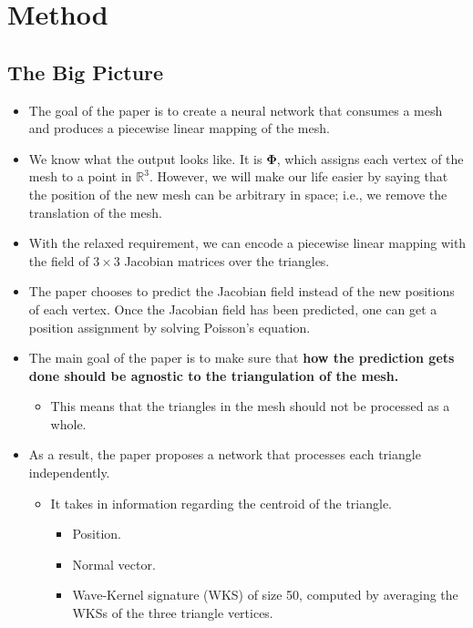 \documentclass[10pt]{article}
\newcommand{\ves}[1]{\boldsymbol{#1}}
\newcommand{\Real}{\mathbb{R}}
\begin{document}
\section{Method}

\subsection{The Big Picture}

\begin{itemize}
    \item The goal of the paper is to create a neural network that consumes a mesh and produces a piecewise linear mapping of the mesh.    
    
    \item We know what the output looks like. It is $\ves{\Phi}$, which assigns each vertex of the mesh to a point in $\Real^3$. However, we will make our life easier by saying that the position of the new mesh can be arbitrary in space; i.e., we remove the translation of the mesh.
    
    \item With the relaxed requirement, we can encode a piecewise linear mapping with the field of $3\times3$ Jacobian matrices over the triangles.
    
    \item The paper chooses to predict the Jacobian field instead of the new positions of each vertex. Once the Jacobian field has been predicted, one can get a position assignment by solving Poisson's equation.
    
    \item The main goal of the paper is to make sure that {\bf how the prediction gets done should be agnostic to the triangulation of the mesh.}
    \begin{itemize}
        \item This means that the triangles in the mesh should not be processed as a whole.
    \end{itemize}

    \item As a result, the paper proposes a network that processes each triangle independently.
    \begin{itemize}
        \item It takes in information regarding the centroid of the triangle.
        \begin{itemize}
            \item Position.
            \item Normal vector.
            \item Wave-Kernel signature (WKS) \cite{Aubry:WKS:2011} of size 50, computed by averaging the WKSs of the three triangle vertices.
        \end{itemize}


\end{itemize}
\end{itemize}
\end{document}
